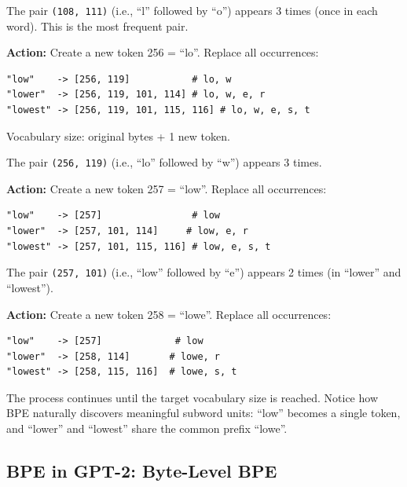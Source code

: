 \documentclass[11pt,a4paper]{article}
\begin{document}
\begin{tcolorbox}[colback=white, colframe=alfaisalgreen, boxrule=0.5pt, title={\textbf{Merge 1 --- Most frequent pair: (108, 111) = ``lo''}}]
The pair \texttt{(108, 111)} (i.e., ``l'' followed by ``o'') appears 3 times (once in each word). This is the most frequent pair.

\textbf{Action:} Create a new token 256 = ``lo''. Replace all occurrences:
\begin{lstlisting}
"low"    -> [256, 119]           # lo, w
"lower"  -> [256, 119, 101, 114] # lo, w, e, r
"lowest" -> [256, 119, 101, 115, 116] # lo, w, e, s, t
\end{lstlisting}
Vocabulary size: original bytes + 1 new token.
\end{tcolorbox}

\begin{tcolorbox}[colback=white, colframe=alfaisalgreen, boxrule=0.5pt, title={\textbf{Merge 2 --- Most frequent pair: (256, 119) = ``low''}}]
The pair \texttt{(256, 119)} (i.e., ``lo'' followed by ``w'') appears 3 times.

\textbf{Action:} Create a new token 257 = ``low''. Replace all occurrences:
\begin{lstlisting}
"low"    -> [257]                # low
"lower"  -> [257, 101, 114]     # low, e, r
"lowest" -> [257, 101, 115, 116] # low, e, s, t
\end{lstlisting}
\end{tcolorbox}

\begin{tcolorbox}[colback=white, colframe=alfaisalgreen, boxrule=0.5pt, title={\textbf{Merge 3 --- Most frequent pair: (257, 101) = ``lowe''}}]
The pair \texttt{(257, 101)} (i.e., ``low'' followed by ``e'') appears 2 times (in ``lower'' and ``lowest'').

\textbf{Action:} Create a new token 258 = ``lowe''. Replace all occurrences:
\begin{lstlisting}
"low"    -> [257]             # low
"lower"  -> [258, 114]       # lowe, r
"lowest" -> [258, 115, 116]  # lowe, s, t
\end{lstlisting}
\end{tcolorbox}

The process continues until the target vocabulary size is reached. Notice how BPE naturally discovers meaningful subword units: ``low'' becomes a single token, and ``lower'' and ``lowest'' share the common prefix ``lowe''.

\subsection{BPE in GPT-2: Byte-Level BPE}
\end{document}
